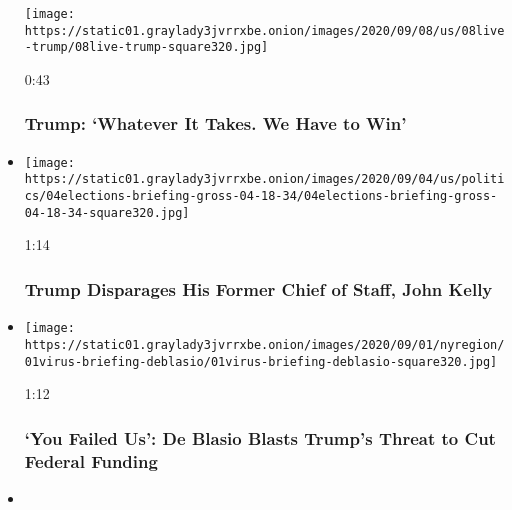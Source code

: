 \begin{itemize}
  \texttt{[image: https://static01.graylady3jvrrxbe.onion/images/2020/09/08/us/08live-trump/08live-trump-square320.jpg]}

  0:43

  \hypertarget{trump-whatever-it-takes-we-have-to-win}{%
  \subsubsection{Trump: `Whatever It Takes. We Have to
  Win'}\label{trump-whatever-it-takes-we-have-to-win}}
\item
  \href{https://www.nytimes3xbfgragh.onion/video/us/politics/100000007325881/trump-john-kelly-the-atlantic.html?action=click\&module=video-series-bar\&region=header\&pgtype=Article\&playlistId=video/us-politics}{}

  \texttt{[image: https://static01.graylady3jvrrxbe.onion/images/2020/09/04/us/politics/04elections-briefing-gross-04-18-34/04elections-briefing-gross-04-18-34-square320.jpg]}

  1:14

  \hypertarget{trump-disparages-his-former-chief-of-staff-john-kelly}{%
  \subsubsection{Trump Disparages His Former Chief of Staff, John
  Kelly}\label{trump-disparages-his-former-chief-of-staff-john-kelly}}
\item
  \href{https://www.nytimes3xbfgragh.onion/video/us/elections/100000007322983/deblasio-trump-nyc-funding.html?action=click\&module=video-series-bar\&region=header\&pgtype=Article\&playlistId=video/us-politics}{}

  \texttt{[image: https://static01.graylady3jvrrxbe.onion/images/2020/09/01/nyregion/01virus-briefing-deblasio/01virus-briefing-deblasio-square320.jpg]}

  1:12

  \hypertarget{you-failed-us-de-blasio-blasts-trumps-threat-to-cut-federal-funding}{%
  \subsubsection{`You Failed Us': De Blasio Blasts Trump's Threat to Cut
  Federal
  Funding}\label{you-failed-us-de-blasio-blasts-trumps-threat-to-cut-federal-funding}}
\item
  \href{https://www.nytimes3xbfgragh.onion/video/us/politics/100000007320987/pompeo-who-coronavirus-vaccine.html?action=click\&module=video-series-bar\&region=header\&pgtype=Article\&playlistId=video/us-politics}{}


\end{itemize}
